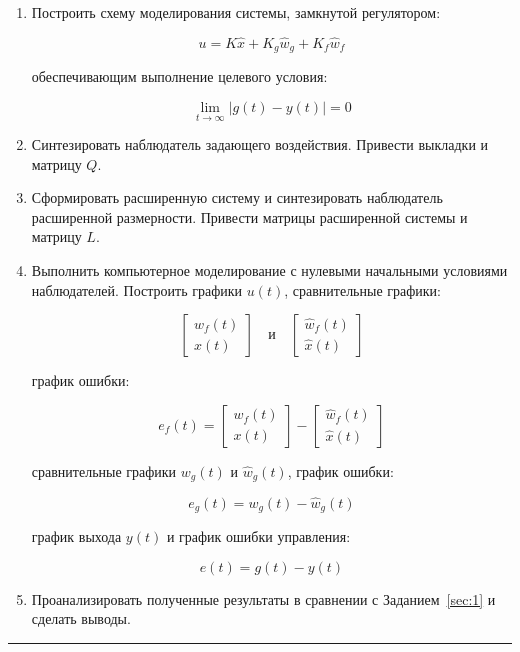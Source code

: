 \documentclass[a4paper,12pt]{article}
\begin{document}
\begin{enumerate}
	\item Построить схему моделирования системы, замкнутой регулятором:
	
	\[
	u = K \hat x + K_g \hat w_g + K_f \hat w_f
	\]
	
	обеспечивающим выполнение целевого условия:
	
	\[
	\lim_{t \to \infty} |g(t) - y(t)| = 0
	\]
	
	\item Синтезировать наблюдатель задающего воздействия. Привести выкладки и матрицу \(Q\).
	
	\item Сформировать расширенную систему и синтезировать наблюдатель расширенной размерности. Привести матрицы расширенной системы и матрицу \(L\).
	
	\item Выполнить компьютерное моделирование с нулевыми начальными условиями наблюдателей. Построить графики \(u(t)\), сравнительные графики:
	
	\[
	\begin{bmatrix} w_f(t) \\ x(t) \end{bmatrix}
	\quad \text{и} \quad
	\begin{bmatrix} \hat{w}_f(t) \\ \hat{x}(t) \end{bmatrix}
	\]
	
	график ошибки:
	
	\[
	e_f(t) = 
	\begin{bmatrix} w_f(t) \\ x(t) \end{bmatrix}
	-
	\begin{bmatrix} \hat{w}_f(t) \\ \hat{x}(t) \end{bmatrix}
	\]
	
	сравнительные графики \(w_g(t)\) и \(\hat{w}_g(t)\), график ошибки:
	
	\[
	e_g(t) = w_g(t) - \hat{w}_g(t)
	\]
	
	график выхода \(y(t)\) и график ошибки управления:
	
	\[
	e(t) = g(t) - y(t)
	\]
	
	\item Проанализировать полученные результаты в сравнении с Заданием~\ref{sec:1} и сделать выводы.
\end{enumerate}
	
	\hrule \newpage
	
\end{document}
